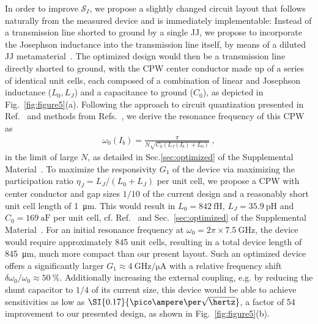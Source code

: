 In order to improve $\mathcal{S}_I$, we propose a slightly changed circuit layout that follows naturally from the measured device and is immediately implementable:
% 
Instead of a transmission line shorted to ground by a single JJ, we propose to incorporate the Josephson inductance into the transmission line itself, by means of a diluted JJ metamaterial~\cite{planatUnderstandingSaturationPower2019}.
% 
The optimized design would then be a transmission line directly shorted to ground, with the CPW center conductor made up of a series of identical unit cells, each composed of a combination of linear and Josephson inductance ($L_0,L_J$) and a capacitance to ground ($C_0$), as depicted in Fig.~\ref{fig:figure5}(a).
% 
Following the approach to circuit quantization presented in Ref.~\cite{gelyQuCATQuantumCircuit2019} and methods from Refs.~\cite{noscheseTridiagonalToeplitzMatrices2013,niggBlackBoxSuperconductingCircuit2012,vool_introductionquantum_2017}, we derive the resonance frequency of this CPW as
% 
\begin{align}
\omega_0(I_b)=\frac{\pi}{N\sqrt{C_0(L_J(I_b)+L_0)}} \ ,
\end{align}
% 
in the limit of large $N$, as detailed in Sec.\ref{sec:optimized} of the Supplemental Material~\cite{SeeSupplementalMaterial}.
% 
To maximize the responsivity $G_1$ of the device via maximizing the participation ratio $\eta_J=L_J/(L_0+L_J)$ per unit cell, we propose a CPW with center conductor and gap sizes $1/10$ of the current design and a reasonably short unit cell length of \SI{1}{\micro\meter}.
% 
This would result in $L_0=\SI{842}{\femto\henry}$, $L_J=\SI{35.9}{\pico\henry}$ and $C_0=\SI{169}{\atto\farad}$ per unit cell, cf. Ref.~\cite{simonsCoplanarWaveguideCircuits2001} and Sec.~\ref{sec:optimized} of the Supplemental Material~\cite{SeeSupplementalMaterial}.
% 
For an initial resonance frequency at $\omega_0=2\pi\times\SI{7.5}{\giga\hertz}$, the device would require approximately 845 unit cells, resulting in a total device length of \SI{845}{\micro\meter}, much more compact than our present layout.
% 
Such an optimized device offers a significantly larger $G_1\approx\SI{4}{\giga\hertz\per\micro\ampere}$ with a relative frequency shift $\delta\omega_0/\omega_0\approx\SI{50}{\percent}$.
% 
Additionally increasing the external coupling, e.g. by reducing the shunt capacitor to $1/4$ of its current size, this device would be able to achieve sensitivities as low as $\SI{0.17}{\pico\ampere\per\sqrt{\hertz}}$, a factor of 54 improvement to our presented design, as shown in Fig.~\ref{fig:figure5}(b).
